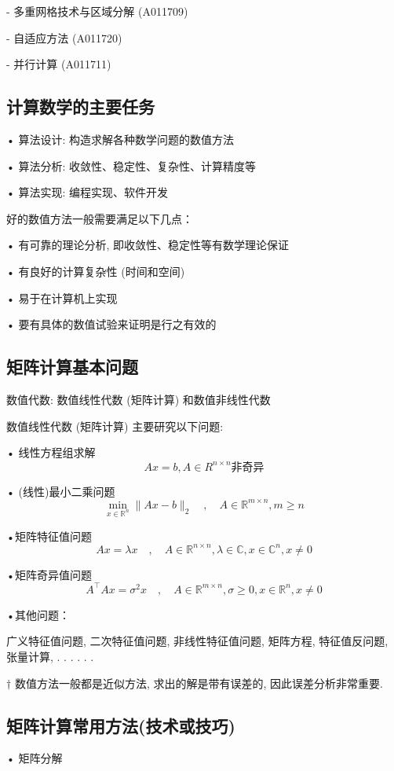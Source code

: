 \documentclass[12pt,a4paper]{article}
\begin{document}
- 多重网格技术与区域分解 (A011709)

- 自适应方法 (A011720)

- 并行计算 (A011711)

\subsection{计算数学的主要任务}

• 算法设计: 构造求解各种数学问题的数值方法

• 算法分析: 收敛性、稳定性、复杂性、计算精度等

• 算法实现: 编程实现、软件开发

好的数值方法一般需要满足以下几点：

• 有可靠的理论分析, 即收敛性、稳定性等有数学理论保证

• 有良好的计算复杂性 (时间和空间)

• 易于在计算机上实现

• 要有具体的数值试验来证明是行之有效的

\subsection{矩阵计算基本问题}
数值代数: 数值线性代数 (矩阵计算) 和数值非线性代数

数值线性代数 (矩阵计算) 主要研究以下问题:

• 线性方程组求解
$$Ax=b,A \in R^{n \times n}\text{非奇异}$$

• (线性)最小二乘问题
$$
\min _{x \in \mathbb{R}^{n}}\|A x-b\|_{2} \quad, \quad A \in \mathbb{R}^{m \times n}, m \geq n
$$

•矩阵特征值问题
$$
A x=\lambda x \quad, \quad A \in \mathbb{R}^{n \times n}, \lambda \in \mathbb{C}, x \in \mathbb{C}^{n}, x \neq 0
$$

•矩阵奇异值问题
$$
A^{\top} A x=\sigma^{2} x \quad, \quad A \in \mathbb{R}^{m \times n}, \sigma \geq 0, x \in \mathbb{R}^{n}, x \neq 0
$$

•其他问题：

广义特征值问题, 二次特征值问题, 非线性特征值问题, 矩阵方程, 特征值反问题, 张量计算, . . . . . .
\begin{framed}
	
	$†$ 数值方法一般都是近似方法, 求出的解是带有误差的, 因此误差分析非常重要.
	
\end{framed}

\subsection{矩阵计算常用方法(技术或技巧)}
	• 矩阵分解
	
\end{document}
